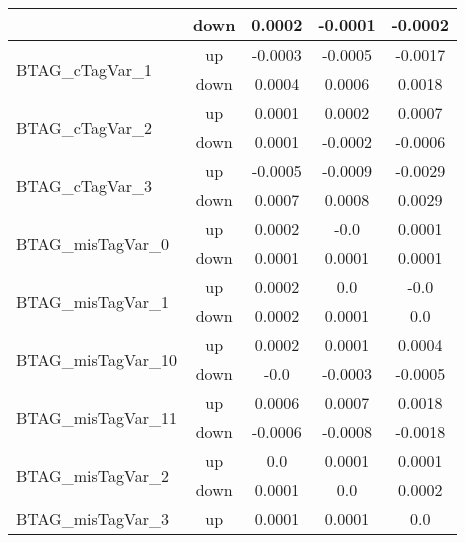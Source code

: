 \begin{table}[h!]
\begin{tabular}{lcccc}
                                       & down &     0.0002     &     -0.0001     &     -0.0002       \\ \hline
\multirow{2}{*}{BTAG\_cTagVar\_1}      & up   &     -0.0003     &     -0.0005     &     -0.0017      \\
                                       & down &     0.0004     &     0.0006     &     0.0018       \\ \hline
\multirow{2}{*}{BTAG\_cTagVar\_2}      & up   &     0.0001     &     0.0002     &     0.0007      \\
                                       & down &     0.0001     &     -0.0002     &     -0.0006       \\ \hline
\multirow{2}{*}{BTAG\_cTagVar\_3}      & up   &     -0.0005     &     -0.0009     &     -0.0029      \\
                                       & down &     0.0007     &     0.0008     &     0.0029       \\ \hline
\multirow{2}{*}{BTAG\_misTagVar\_0}      & up   &     0.0002     &     -0.0     &     0.0001      \\
                                       & down &     0.0001     &     0.0001     &     0.0001       \\ \hline
\multirow{2}{*}{BTAG\_misTagVar\_1}      & up   &     0.0002     &     0.0     &     -0.0      \\
                                       & down &     0.0002     &     0.0001     &     0.0       \\ \hline
\multirow{2}{*}{BTAG\_misTagVar\_10}      & up   &     0.0002     &     0.0001     &     0.0004      \\
                                       & down &     -0.0     &     -0.0003     &     -0.0005       \\ \hline
\multirow{2}{*}{BTAG\_misTagVar\_11}      & up   &     0.0006     &     0.0007     &     0.0018      \\
                                       & down &     -0.0006     &     -0.0008     &     -0.0018       \\ \hline
\multirow{2}{*}{BTAG\_misTagVar\_2}      & up   &     0.0     &     0.0001     &     0.0001      \\
                                       & down &     0.0001     &     0.0     &     0.0002       \\ \hline
\multirow{2}{*}{BTAG\_misTagVar\_3}      & up   &     0.0001     &     0.0001     &     0.0      \\

\end{tabular}
\end{table}
